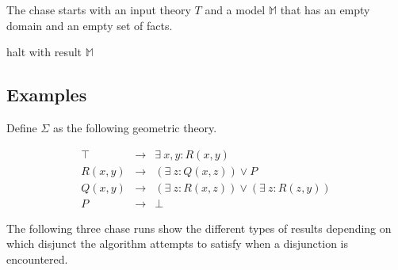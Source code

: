 		The chase starts with an input theory $T$ and a model $\mathbb{M}$ that
		has an empty domain and an empty set of facts.

		\begin{algorithm}[H]
		\DontPrintSemicolon
		halt with result $\mathbb{M}$ \;
		\end{algorithm}

	\subsection{Examples}

		Define $\Sigma$ as the following geometric theory.

		\begin{eqnarray}
			\label{eqn:chase1}
			\top    &  \to  &  \exists\ x,y : R(x,y)                             \\
			\label{eqn:chase2}
			R(x,y)  &  \to  &  (\exists\ z : Q(x,z)) \vee P                      \\
			\label{eqn:chase3}
			Q(x,y)  &  \to  &  (\exists\ z : R(x,z)) \vee (\exists\ z : R(z,y))  \\
			\label{eqn:chase4}
			P       &  \to  &  \bot
		\end{eqnarray}

		The following three chase runs show the different types of results
		depending on which disjunct the algorithm attempts to satisfy when a
		disjunction is encountered.


